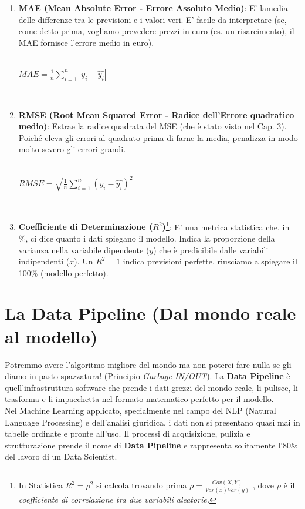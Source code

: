 \documentclass{article}
\begin{document}
\begin{enumerate}
    \item \textbf{MAE (Mean Absolute Error - Errore Assoluto Medio)}: E' lamedia delle differenze tra le previsioni e i valori veri. E' facile da interpretare (se, come detto prima, vogliamo prevedere prezzi in euro (es. un risarcimento), il MAE fornisce l'errore medio in euro).\\
    \\
    \centerline{$MAE = \frac{1}{n}\sum_{i=1}^{n} |y_i - \hat{y_i}|$} \\

\item \textbf{RMSE (Root Mean Squared Error - Radice dell'Errore quadratico medio)}: Estrae la radice quadrata del MSE (che è stato visto nel Cap. 3). Poiché eleva gli errori al quadrato prima di farne la media, penalizza in modo molto severo gli errori grandi.\\
\\
\centerline{$RMSE = \sqrt{\frac{1}{n} \sum_{i=1}^{n}(y_i-\hat{y_i})^2}$}
\\
\item \textbf{Coefficiente di Determinazione ($R^2$)}\footnote{In Statistica $R^2 = \rho^2$ si calcola trovando prima $\rho = \frac{Cov(X,Y)}{Var(x)Var(y)}$ , dove $\rho$ è il \textit{coefficiente di correlazione tra due variabili aleatorie.}}: E' una metrica statistica che, in \%, ci dice quanto i dati spiegano il modello. Indica la proporzione della varianza nella variabile dipendente ($y$) che è predicibile dalle variabili indipendenti ($x$). Un $R^2=1$ indica previsioni perfette, riusciamo a spiegare il 100\% (modello perfetto).

\end{enumerate}

\section{La Data Pipeline (Dal mondo reale al modello)}
Potremmo avere l'algoritmo migliore del mondo ma non poterci fare nulla se gli diamo in pasto spazzatura! (Principio \textit{Garbage IN/OUT}). La \textbf{Data Pipeline} è quell'infrastruttura software che prende i dati grezzi del mondo reale, li pulisce, li trasforma e li impacchetta nel formato matematico perfetto per il modello.
\\
Nel Machine Learning applicato, specialmente nel campo del NLP (Natural Language Processing) e dell'analisi giuridica, i dati non si presentano quasi mai in tabelle ordinate e pronte all'uso. Il processi di acquisizione, pulizia e strutturazione prende il nome di \textbf{Data Pipeline} e rappresenta solitamente l'80\& del lavoro di un Data Scientist.
\end{document}
